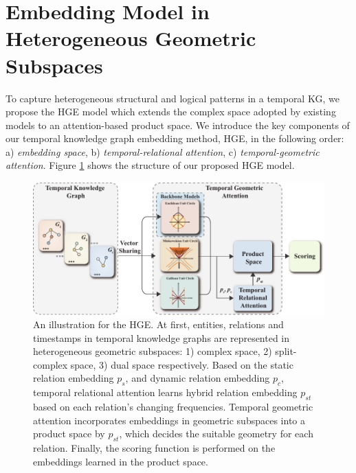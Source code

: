 \documentclass[letterpaper]{article} %
\begin{document}
\section{Embedding Model in Heterogeneous Geometric Subspaces}
To capture heterogeneous structural and logical patterns in a temporal KG, we propose the HGE model which extends the complex space adopted by existing models\cite{tltcomplexzhang2022along, tcomplexlacroix2020tensor} to an attention-based product space. We introduce the key components of our temporal knowledge graph embedding method, HGE, in the following order:
a) \emph{embedding space},
b) \emph{temporal-relational attention},
c) \emph{temporal-geometric attention}. Figure \ref{fig:HGE_model} shows the structure of our proposed HGE model.


\begin{figure}[t]
    \centering
    \includegraphics[width=\textwidth]{HGE_model.pdf}
    \caption{
An illustration for the HGE. At first, entities, relations and timestamps in temporal knowledge graphs are represented in heterogeneous geometric subspaces: 1) complex space, 2) split-complex space, 3) dual space respectively. Based on the static relation embedding $p_{s}$, and dynamic relation embedding $p_{c}$, temporal relational attention learns hybrid relation embedding $p_{st}$ based on each relation's changing frequencies. Temporal geometric attention incorporates embeddings in geometric subspaces into a product space by $p_{st}$, which decides the suitable geometry for each relation. Finally, the scoring function is performed on the embeddings learned in the product space.
    }
    \label{fig:HGE_model}
\end{figure}
\end{document}
